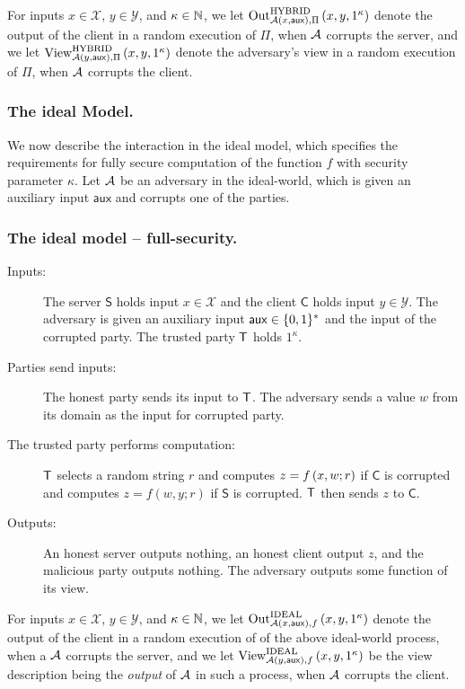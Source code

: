 \documentclass{llncs}
\newcommand{\X}{\mathcal{X}}
\newcommand{\Y}{\mathcal{Y}}
\newcommand{\aux}{\mathsf{aux}}
\newcommand{\HYBRID}{\operatorname{HYBRID}}
\newcommand{\IDEAL}{\operatorname{IDEAL}}
\newcommand{\Out}{\operatorname{Out}}
\newcommand{\View}{\operatorname{View}}
\renewcommand{\Sc}{\mathsf{S}}
\newcommand{\Cc}{\mathsf{C}}
\begin{document}
For inputs $x\in\X$, $y\in\Y$, and $\kappa\in{\mathbb{N}}$, we let $\Out^{\HYBRID}_{\adv\of{x,\aux},\Pi}\of{x,y,1^{\kappa}}$ denote the output of the client in a random execution of $\Pi$, when $\mathcal{A}$ corrupts the server, and we let $\View^{\HYBRID}_{\adv\of{y,\aux},\Pi}\of{x,y,1^{\kappa}}$ denote the adversary's view in a random execution of $\Pi$, when $\mathcal{A}$ corrupts the client.


\subsubsection*{The ideal Model.}
We now describe the interaction in the ideal model, which specifies the requirements for fully secure computation of the function $f$ with security parameter $\kappa$. Let $\mathcal{A}$ be an adversary in the ideal-world, which is given an auxiliary input $\aux$ and corrupts one of the parties.

\subsubsection*{The ideal model -- full-security.}
\begin{description}

\item[Inputs:] The server $\Sc$ holds input $x\in\X$ and the client $\Cc$ holds input $y\in\Y$. The adversary is given an auxiliary input $\aux\in\zo^{*}$ and the input of the corrupted party. The trusted party $\mathsf{T}$ holds $1^{\kappa}$.

\item[Parties send inputs:] The honest party sends its input to $\mathsf{T}$. The adversary sends a value $w$ from its domain as the input for corrupted party.

\item[The trusted party performs computation:] $\mathsf{T}$ selects a random string $r$ and computes $z=f\left ( x,w;r \right )$ if $\Cc$ is corrupted and  computes $z=f(w,y;r)$ if $\Sc$ is corrupted. $\mathsf{T}$ then sends $z$ to $\Cc$.

\item[Outputs:] An honest server outputs nothing, an honest client output $z$, and the malicious party outputs nothing. The adversary outputs some function of its view.
\end{description}

For inputs $x\in\X$, $y\in\Y$, and $\kappa\in{\mathbb{N}}$, we let $\Out^{\IDEAL}_{\adv\of{x,\aux},f}\of{x,y,1^{\kappa}}$ denote the output of the client in a random execution of of the above ideal-world process, when a $\mathcal{A}$ corrupts the server, and we let $\View^{\IDEAL}_{\adv\of{y,\aux},f}\of{x,y,1^{\kappa}}$ be the view description being the \emph{output} of $\mathcal{A}$ in such a process, when $\mathcal{A}$ corrupts the client.
\end{document}
